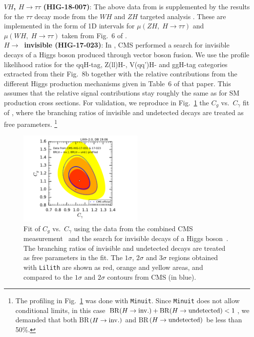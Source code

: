 {\bf\boldmath $VH$, $H\to\tau\tau$ (HIG-18-007)}: The above data from \cite{Sirunyan:2018koj} is supplemented by the results 
for the $\tau\tau$ decay mode from the $WH$ and $ZH$ targeted analysis \cite{Sirunyan:2018cpi}. These are implemented in the 
form of 1D intervals for $\mu(ZH,\;H\to\tau\tau)$ and $\mu(WH,\;H\to\tau\tau)$ taken from Fig.~6 of \cite{Sirunyan:2018cpi}. \\

{\bf\boldmath $H\to$~invisible (HIG-17-023)}: 
In \cite{Sirunyan:2018owy}, CMS performed a search for invisible decays of a Higgs boson produced through vector boson fusion. 
We use the profile likelihood ratios for the qqH-tag, Z(ll)H-, V(qq')H- and ggH-tag categories extracted 
from their Fig.~8b together with the relative contributions from the different Higgs production mechanisms  
given in Table~6 of that paper. This assumes that the relative signal contributions stay roughly the same as for 
SM production cross sections. For validation, we reproduce in Fig.~\ref{fig:validation_cms_inv}
 the $C_g$ vs.\ $C_\gamma$ fit of \cite{Sirunyan:2018koj}, where the branching ratios of invisible and undetected decays 
are treated as free parameters.%
\footnote{The profiling in Fig.~\ref{fig:validation_cms_inv} was done with {\tt Minuit}. 
  Since {\tt Minuit} does not allow conditional limits, in this case ${\rm BR}(H\to {\rm inv.})+{\rm BR}(H\to {\rm undetected})<1$, 
  we demanded that both BR$(H\to {\rm inv.})$ and BR$(H\to {\rm undetected})$ be less than 50\%.} 

\begin{figure}[t!]\centering
\includegraphics[width=0.55\textwidth]{validation/CMS/HIG-17-031-CgCGa_BRinvBRund_profiled.pdf}%
\vspace*{-2mm}
\caption{Fit of $C_g$ vs.\ $C_\gamma$ using the data from the combined CMS measurement~\cite{Sirunyan:2018koj} and the 
search for invisible decays of a Higgs boson~\cite{Sirunyan:2018owy}. The branching ratios of invisible and undetected decays 
are treated as free parameters in the fit. 
The  $1\sigma$,  $2\sigma$ and $3\sigma$ regions obtained with {\tt Lilith} are shown as red, orange and yellow areas, 
and compared to the $1\sigma$ and $2\sigma$ contours from CMS (in blue).}
\label{fig:validation_cms_inv}
\end{figure}


